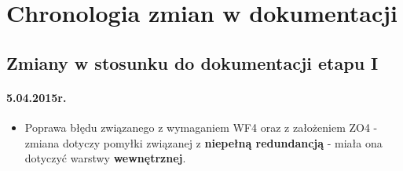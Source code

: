 \chapter{Chronologia zmian w dokumentacji}

\section{Zmiany w stosunku do dokumentacji etapu I}

\subsubsection*{5.04.2015r.}
\begin{itemize}
\item Poprawa błędu związanego z wymaganiem WF4 oraz z założeniem ZO4 - zmiana dotyczy pomyłki związanej z \textbf{niepełną redundancją} - miała ona dotyczyć warstwy \textbf{wewnętrznej}.

\end{itemize}
